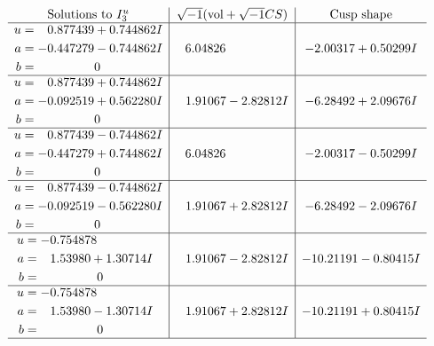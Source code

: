 \documentclass[1p]{elsarticle_modified}
\theoremstyle{definition}
\newcommand{\I}{\sqrt{-1}}
\begin{document}
$$\begin{array}{c|c|c}  
\text{Solutions to }I^u_{3}& \I (\text{vol} + \sqrt{-1}CS) & \text{Cusp shape}\\
 \hline 
\begin{aligned}
u &= \phantom{-}0.877439 + 0.744862 I \\
a &= -0.447279 - 0.744862 I \\
b &= \phantom{-0.000000 } 0\end{aligned}
 & \phantom{-}6.04826\phantom{ +0.000000I} & -2.00317 + 0.50299 I \\ \hline\begin{aligned}
u &= \phantom{-}0.877439 + 0.744862 I \\
a &= -0.092519 + 0.562280 I \\
b &= \phantom{-0.000000 } 0\end{aligned}
 & \phantom{-}1.91067 - 2.82812 I & -6.28492 + 2.09676 I \\ \hline\begin{aligned}
u &= \phantom{-}0.877439 - 0.744862 I \\
a &= -0.447279 + 0.744862 I \\
b &= \phantom{-0.000000 } 0\end{aligned}
 & \phantom{-}6.04826\phantom{ +0.000000I} & -2.00317 - 0.50299 I \\ \hline\begin{aligned}
u &= \phantom{-}0.877439 - 0.744862 I \\
a &= -0.092519 - 0.562280 I \\
b &= \phantom{-0.000000 } 0\end{aligned}
 & \phantom{-}1.91067 + 2.82812 I & -6.28492 - 2.09676 I \\ \hline\begin{aligned}
u &= -0.754878\phantom{ +0.000000I} \\
a &= \phantom{-}1.53980 + 1.30714 I \\
b &= \phantom{-0.000000 } 0\end{aligned}
 & \phantom{-}1.91067 - 2.82812 I & -10.21191 - 0.80415 I \\ \hline\begin{aligned}
u &= -0.754878\phantom{ +0.000000I} \\
a &= \phantom{-}1.53980 - 1.30714 I \\
b &= \phantom{-0.000000 } 0\end{aligned}
 & \phantom{-}1.91067 + 2.82812 I & -10.21191 + 0.80415 I\\
 \hline 
 \end{array}$$\newpage
\end{document}
